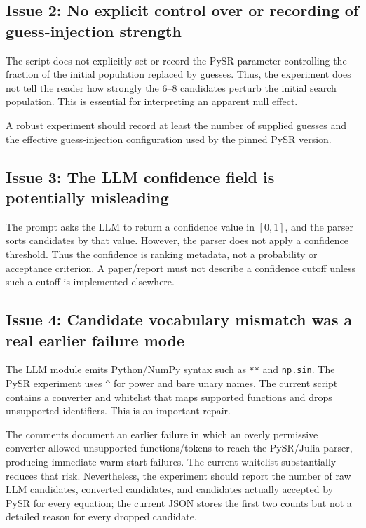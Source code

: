 \documentclass[11pt]{article}
\begin{document}
\subsection{Issue 2: No explicit control over or recording of guess-injection strength}

The script does not explicitly set or record the PySR parameter controlling the fraction of the initial population replaced by guesses. Thus, the experiment does not tell the reader how strongly the 6--8 candidates perturb the initial search population. This is essential for interpreting an apparent null effect.

A robust experiment should record at least the number of supplied guesses and the effective guess-injection configuration used by the pinned PySR version.

\subsection{Issue 3: The LLM confidence field is potentially misleading}

The prompt asks the LLM to return a confidence value in \([0,1]\), and the parser sorts candidates by that value. However, the parser does not apply a confidence threshold. Thus the confidence is ranking metadata, not a probability or acceptance criterion. A paper/report must not describe a confidence cutoff unless such a cutoff is implemented elsewhere.

\subsection{Issue 4: Candidate vocabulary mismatch was a real earlier failure mode}

The LLM module emits Python/NumPy syntax such as \texttt{**} and \texttt{np.sin}. The PySR experiment uses \texttt{\^} for power and bare unary names. The current script contains a converter and whitelist that maps supported functions and drops unsupported identifiers. This is an important repair.

The comments document an earlier failure in which an overly permissive converter allowed unsupported functions/tokens to reach the PySR/Julia parser, producing immediate warm-start failures. The current whitelist substantially reduces that risk. Nevertheless, the experiment should report the number of raw LLM candidates, converted candidates, and candidates actually accepted by PySR for every equation; the current JSON stores the first two counts but not a detailed reason for every dropped candidate.
\end{document}
